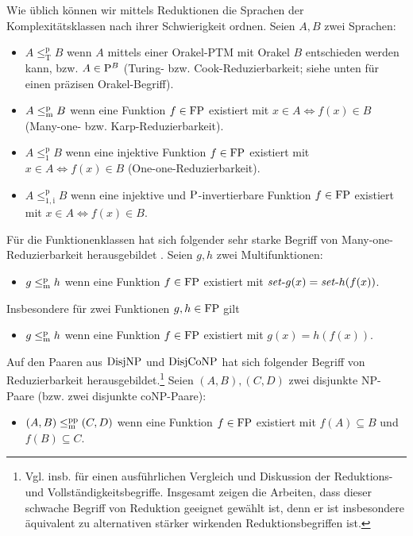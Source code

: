 Wie üblich können wir mittels Reduktionen die Sprachen der Komplexitätsklassen nach ihrer Schwierigkeit ordnen. Seien $A,B$ zwei Sprachen:
\begin{itemize}
    \item $A\leq_\mathrm{T}^\mathrm{p} B$ wenn $A$ mittels einer Orakel-PTM mit Orakel $B$ entschieden werden kann, bzw. $A\in\P^B$ (Turing- bzw. Cook-Reduzierbarkeit; siehe unten für einen präzisen Orakel-Begriff).
    \item $A\leqmp B$ wenn eine Funktion $f\in\FP$ existiert mit $x\in A\iff f(x)\in B$ (Many-one- bzw. Karp-Reduzierbarkeit).
    \item $A\leq_1^\mathrm{p} B$ wenn eine injektive Funktion $f\in\FP$ existiert mit $x\in A\iff f(x)\in B$ (One-one-Reduzierbarkeit).
    \item $A\leq_\mathrm{1,i}^\mathrm{p} B$ wenn eine injektive und $\P$-invertierbare Funktion $f\in\FP$ existiert mit $x\in A\iff f(x)\in B$.
\end{itemize}
Für die Funktionenklassen hat sich folgender sehr starke Begriff von Many-one-Reduzierbarkeit herausgebildet \parencites(vgl.)(){kobler_is_2000}{beyersdorff_nondeterministic_2009}{pudlak_incompleteness_2017}. Seien $g,h$ zwei Multifunktionen:
\begin{itemize}
    \item $g\leqmp h$ wenn eine Funktion $f\in\FP$ existiert mit $\fset{}g(x)=\fset{}h(f(x))$.
\end{itemize}
Insbesondere für zwei Funktionen $g,h\in\FP$ gilt
\begin{itemize}
    \item $g\leqmp h$ wenn eine Funktion $f\in\FP$ existiert mit $g(x)=h(f(x))$.
\end{itemize}
Auf den Paaren aus $\DisjNP$ und $\DisjCoNP$ hat sich folgender Begriff von Reduzierbarkeit herausgebildet.\footnote{Vgl. insb. \textcites{glaser_disjoint_2004}{glaser_reductions_2005} für einen ausführlichen Vergleich und Diskussion der Reduktions- und Vollständigkeitsbegriffe. Insgesamt zeigen die Arbeiten,  dass dieser schwache Begriff von Reduktion geeignet gewählt ist, denn er ist insbesondere äquivalent zu alternativen stärker wirkenden Reduktionsbegriffen ist.}
Seien $(A,B), (C,D)$ zwei disjunkte NP-Paare (bzw. zwei disjunkte coNP-Paare):
\begin{itemize}
    \item $(A,B)\leqmpp(C,D)$ wenn eine Funktion $f\in\FP$ existiert mit $f(A)\subseteq B$ und $f(B)\subseteq C$.
\end{itemize}

